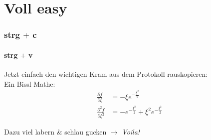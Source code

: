 \section{Voll easy}

\begin{frame}
\frametitle{strg $+$ c}
\framesubtitle{strg $+$ v}

Jetzt einfach den wichtigen Kram aus dem Protokoll rauskopieren: \\
Ein Bissl Mathe:  
\begin{align*}
     \frac{\partial f}{\partial \xi} &= - \xi e^{-\frac{\xi^2}{2}} \\
     \frac{\partial^2 f}{\partial \xi^2} &= - e^{-\frac{\xi^2}{2}}+ \xi^2 e^{-\frac{\xi^2}{2}}
\end{align*}

Dazu viel labern \& schlau gucken $\rightarrow$ \textit{Voila!}

\end{frame}